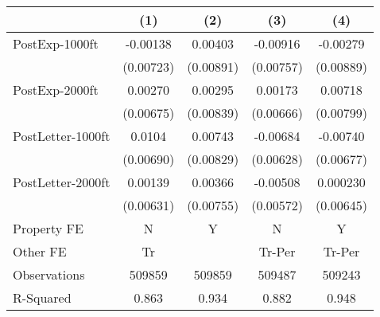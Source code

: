 {
\def\sym#1{\ifmmode^{#1}\else\(^{#1}\)\fi}
\begin{tabular}{l*{4}{c}}
\toprule
                    &\multicolumn{1}{c}{(1)}   &\multicolumn{1}{c}{(2)}   &\multicolumn{1}{c}{(3)}   &\multicolumn{1}{c}{(4)}   \\
\midrule
PostExp-1000ft      &    -0.00138   &     0.00403   &    -0.00916   &    -0.00279   \\
                    &   (0.00723)   &   (0.00891)   &   (0.00757)   &   (0.00889)   \\
\addlinespace
PostExp-2000ft      &     0.00270   &     0.00295   &     0.00173   &     0.00718   \\
                    &   (0.00675)   &   (0.00839)   &   (0.00666)   &   (0.00799)   \\
\addlinespace
PostLetter-1000ft   &      0.0104   &     0.00743   &    -0.00684   &    -0.00740   \\
                    &   (0.00690)   &   (0.00829)   &   (0.00628)   &   (0.00677)   \\
\addlinespace
PostLetter-2000ft   &     0.00139   &     0.00366   &    -0.00508   &    0.000230   \\
                    &   (0.00631)   &   (0.00755)   &   (0.00572)   &   (0.00645)   \\
\midrule
Property FE         &           N   &           Y   &           N   &           Y   \\
Other FE            &          Tr   &               &      Tr-Per   &      Tr-Per   \\
Observations        &      509859   &      509859   &      509487   &      509243   \\
R-Squared           &       0.863   &       0.934   &       0.882   &       0.948   \\
\bottomrule
\end{tabular}
}
